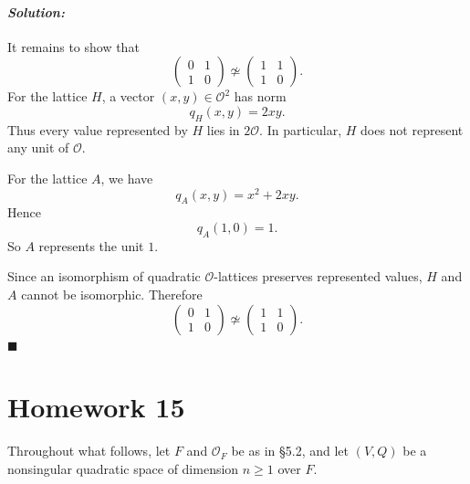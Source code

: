 \documentclass[12pt, a4paper]{article}
\newenvironment{solution}
  {\paragraph{\textit{Solution:}}\par\medskip}
  {\hfill$\blacksquare$\vspace{0.1cm}}
\begin{document}
\begin{solution}
It remains to show that
\[
\begin{pmatrix}
0&1\\
1&0
\end{pmatrix}
\not\simeq
\begin{pmatrix}
1&1\\
1&0
\end{pmatrix}.
\]
For the lattice \(H\), a vector \((x,y)\in\mathcal O^2\) has norm
\[
q_H(x,y)=2xy.
\]
Thus every value represented by \(H\) lies in \(2\mathcal O\). In particular,
\(H\) does not represent any unit of \(\mathcal O\).

For the lattice \(A\), we have
\[
q_A(x,y)=x^2+2xy.
\]
Hence
\[
q_A(1,0)=1.
\]
So \(A\) represents the unit \(1\).

Since an isomorphism of quadratic \(\mathcal O\)-lattices preserves represented
values, \(H\) and \(A\) cannot be isomorphic. Therefore
\[
\begin{pmatrix}
0&1\\
1&0
\end{pmatrix}
\not\simeq
\begin{pmatrix}
1&1\\
1&0
\end{pmatrix}.
\]
\end{solution}
\section*{Homework 15}
\noindent Throughout what follows, let $F$ and $\mathcal{O}_F$ be as in \S 5.2, and let $(V,Q)$ be a nonsingular quadratic space of dimension $n \ge 1$ over $F$.
\end{document}
